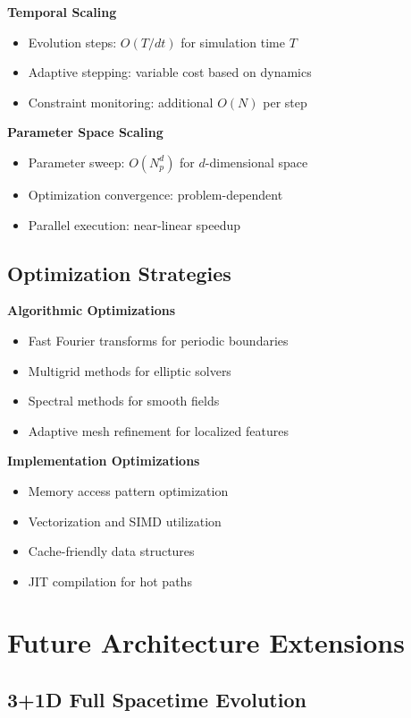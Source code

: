 \documentclass[11pt]{article}
\begin{document}
\textbf{Temporal Scaling}
\begin{itemize}
\item Evolution steps: $O(T/dt)$ for simulation time $T$
\item Adaptive stepping: variable cost based on dynamics
\item Constraint monitoring: additional $O(N)$ per step
\end{itemize}

\textbf{Parameter Space Scaling}
\begin{itemize}
\item Parameter sweep: $O(N_p^d)$ for $d$-dimensional space
\item Optimization convergence: problem-dependent
\item Parallel execution: near-linear speedup
\end{itemize}

\subsection{Optimization Strategies}

\textbf{Algorithmic Optimizations}
\begin{itemize}
\item Fast Fourier transforms for periodic boundaries
\item Multigrid methods for elliptic solvers
\item Spectral methods for smooth fields
\item Adaptive mesh refinement for localized features
\end{itemize}

\textbf{Implementation Optimizations}
\begin{itemize}
\item Memory access pattern optimization
\item Vectorization and SIMD utilization
\item Cache-friendly data structures
\item JIT compilation for hot paths
\end{itemize}

\section{Future Architecture Extensions}

\subsection{3+1D Full Spacetime Evolution}
\end{document}
